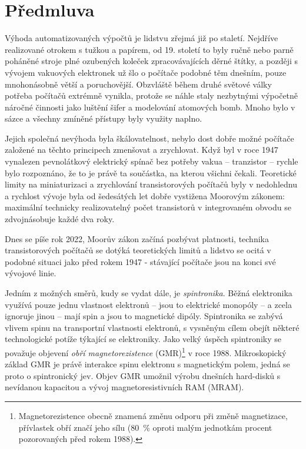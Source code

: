 \chapter*{Předmluva}
Výhoda automatizovaných výpočtů je lidstvu zřejmá již po staletí.
Nejdříve realizované otrokem s tužkou a papírem, od 19. století to byly ručně nebo parně poháněné stroje plné ozubených koleček zpracovávajících děrné štítky, a později s vývojem vakuových elektronek už šlo o počítače podobné těm dnešním, pouze mnohonásobně větší a poruchovější.
Obzvláště během druhé světové války potřeba počítačů extrémně vynikla, protože se náhle staly nezbytnými výpočetně náročné činnosti jako luštění šifer a modelování atomových bomb.
Mnoho bylo v sázce a všechny zmíněné přístupy byly využity naplno.

Jejich společná nevýhoda byla škálovatelnost, nebylo dost dobře možné počítače založené na těchto principech zmenšovat a zrychlovat.
Když byl v roce 1947 vynalezen pevnolátkový elektrický spínač bez potřeby vakua -- tranzistor -- rychle bylo rozpoznáno, že to je právě ta součástka, na kterou všichni čekali.
Teoretické limity na miniaturizaci a zrychlování transistorových počítačů byly v nedohlednu a rychlost vývoje byla od šedesátých let dobře vystižena Moorovým zákonem: maximální technicky realizovatelný počet transistorů v integrovaném obvodu se zdvojnásobuje každé dva roky.

Dnes se píše rok 2022, Moorův zákon začíná pozbývat platnosti, technika transistorových počítačů se dotýká teoretických limitů a lidstvo se ocitá v podobné situaci jako před rokem 1947 - stávající počítače jsou na konci své vývojové linie.

Jedním z možných směrů, kudy se vydat dále, je \emph{spintronika}.
Běžná elektronika využívá pouze jednu vlastnost elektronů -- jsou to elektrické monopóly -- a zcela ignoruje jinou -- mají spin a jsou to magnetické dipóly.
Spintronika se zabývá vlivem spinu na transportní vlastnosti elektronů, s vysněným cílem obejít některé technologické potíže týkající se elektroniky.
Jako velký úspěch spintroniky se považuje objevení \emph{obří magnetorezistence} (GMR)\footnote{Magnetorezistence obecně znamená změnu odporu při změně magnetizace, přívlastek obří značí jeho sílu (\SI{80}{\percent} oproti malým jednotkám procent pozorovaných před rokem 1988).} v roce 1988.
Mikroskopický základ GMR je právě interakce spinu elektronu s magnetickým polem, jedná se proto o spintronický jev.
Objev GMR umožnil výrobu dnešních hard-disků s nevídanou kapacitou a vývoj magnetoresistivních RAM (MRAM).

